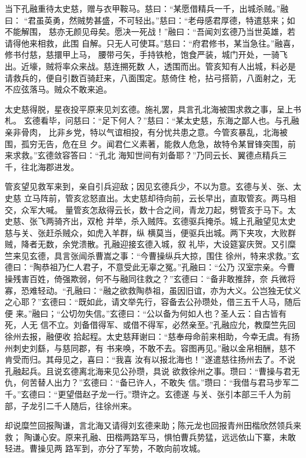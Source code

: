 当下孔融重待太史慈，赠与衣甲鞍马。慈曰：“某愿借精兵一千，出城杀贼。”融曰：
“君虽英勇，然贼势甚盛，不可轻出。”慈曰：“老母感君厚德，特遣慈来；如不能解围，
慈亦无颜见母矣。愿决一死战！”融曰：“吾闻刘玄德乃当世英雄，若请得他来相救，此围
自解。只无人可使耳。”慈曰：“府君修书，某当急往。”融喜，修书付慈，慈擐甲上马，
腰带弓矢，手持铁枪，饱食严装，城门开处，一骑飞出。近壕，贼将率众来战。慈连搠死数
人，透围而出。管亥知有人出城，料必是请救兵的，便自引数百骑赶来，八面围定。慈倚住
枪，拈弓搭箭，八面射之，无不应弦落马。贼众不敢来追。

太史慈得脱，星夜投平原来见刘玄德。施礼罢，具言孔北海被围求救之事，呈上书札。
玄德看毕，问慈曰：“足下何人？”慈曰：“某太史慈，东海之鄙人也。与孔融亲非骨肉，
比非乡党，特以气谊相投，有分忧共患之意。今管亥暴乱，北海被围，孤穷无告，危在旦
夕。闻君仁义素著，能救人危急，故特令某冒锋突围，前来求救。”玄德敛容答曰：“孔北
海知世间有刘备耶？”乃同云长、翼德点精兵三千，往北海郡进发。

管亥望见救军来到，亲自引兵迎敌；因见玄德兵少，不以为意。玄德与关、张、太史慈
立马阵前，管亥忿怒直出。太史慈却待向前，云长早出，直取管亥。两马相交，众军大喊。
量管亥怎敌得云长，数十合之间，青龙刀起，劈管亥于马下。太史慈、张飞两骑齐出，双枪
并举，杀入贼阵。玄德驱兵掩杀。城上孔融望见太史慈与关、张赶杀贼众，如虎入羊群，纵
横莫当，便驱兵出城。两下夹攻，大败群贼，降者无数，余党溃散。孔融迎接玄德入城，叙
礼毕，大设筵宴庆贺。又引糜竺来见玄德，具言张闿杀曹嵩之事：“今曹操纵兵大掠，围住
徐州，特来求救。”玄德曰：“陶恭祖乃仁人君子，不意受此无辜之冤。”孔融曰：“公乃
汉室宗亲。今曹操残害百姓，倚强欺弱，何不与融同往救之？”玄德曰：“备非敢推辞，奈
兵微将寡，恐难轻动。“孔融曰：“融之欲救陶恭祖，虽因旧谊，亦为大义。公岂独无仗义
之心耶？”玄德曰：“既如此，请文举先行，容备去公孙瓒处，借三五千人马，随后便
来。”融曰；“公切勿失信。”玄德曰：“公以备为何如人也？圣人云：自古皆有死，人无
信不立。刘备借得军、或借不得军，必然亲至。”孔融应允，教糜竺先回徐州去报，融便收
拾起程。太史慈拜谢曰：“慈奉母命前来相助，今幸无虞。有扬州刺史刘繇，与慈同郡，有
书来唤，不敢不去。容图再见。”融以金帛相酬，慈不肯受而归。其母见之，喜曰：“我喜
汝有以报北海也！”遂遣慈往扬州去了。不说孔融起兵。且说玄德离北海来见公孙瓒，具说
欲救徐州之事。瓒曰：“曹操与君无仇，何苦替人出力？”玄德曰：“备已许人，不敢失
信。”瓒曰：“我借与君马步军二千。”玄德曰：“更望借赵子龙一行。”瓒许之。玄德遂
与关、张引本部三千人为前部，子龙引二千人随后，往徐州来。

却说糜竺回报陶谦，言北海又请得刘玄德来助；陈元龙也回报青州田楷欣然领兵来救；
陶谦心安。原来孔融、田楷两路军马，惧怕曹兵势猛，远远依山下寨，未敢轻进。曹操见两
路军到，亦分了军势，不敢向前攻城。

